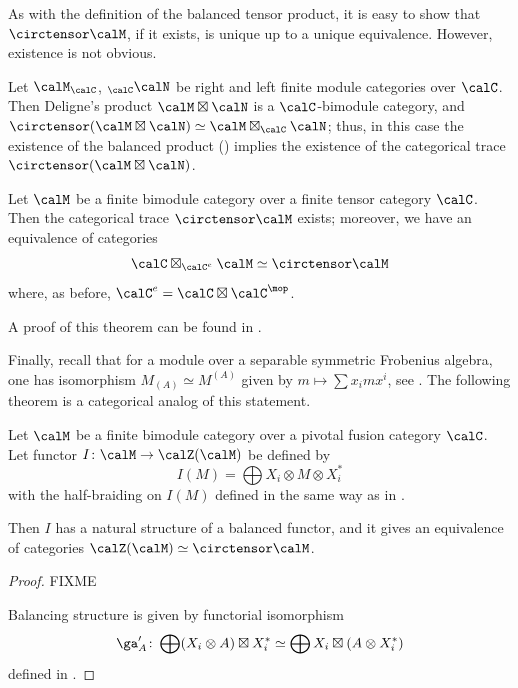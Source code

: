As with the definition of the balanced tensor product, it is easy to show that
$\circtensor \calM$, if it exists, is unique up to a unique equivalence. However,
existence is not obvious.

\begin{example}\label{x:trace-deligne-product}
  Let $\calM_\calC$, ${}_\calC \calN$ be right and left finite module
  categories over $\calC$. Then Deligne's product $\calM\boxtimes \calN$ is
  a $\calC$-bimodule category, and $\circtensor (\calM\boxtimes \calN)\simeq
  \calM\boxtimes_\calC\calN$; thus, in this case the existence of the balanced product
  () implies the existence of the categorical trace
  $\circtensor (\calM\boxtimes\calN)$.
\end{example}
\begin{theorem}\label{t:cat-trace}
  Let $\calM$ be a finite bimodule category over a finite tensor category
  $\calC$. Then the categorical trace $\circtensor \calM$ exists;
  moreover, we have an equivalence of categories
  $$
    \calC\boxtimes_{\calC^e} \calM \simeq \circtensor \calM
  $$
  where, as before, $\calC^e=\calC\boxtimes\calC^\mop$.
\end{theorem}
  A proof of this theorem can be found in
  \cite[Theorem 3.3]{fuchs-schaumann-schweigert-trace}.


Finally, recall that for a module over a separable symmetric Frobenius algebra,
one has isomorphism $M_{(A)}\simeq M^{(A)}$ given by $m\mapsto \sum x_imx^i$,
see . The following theorem is a categorical analog of
this statement.

\begin{theorem}\label{t:category-inv-coinv}
  Let $\calM$ be a finite bimodule category over a pivotal fusion
  category  $\calC$. Let functor $I\colon \calM\to \calZ(\calM)$ be defined by
  \begin{equation}
    I(M)= \bigoplus X_i\otimes M\otimes X_i^*
  \end{equation}
  with the half-braiding on $I(M)$ defined in the same way as in
  .

  Then $I$ has a natural structure of a balanced functor, and it
  gives an equivalence of categories $\calZ(\calM)\simeq \circtensor \calM$.
\end{theorem}
\begin{proof}
    FIXME

    Balancing structure is given by functorial isomorphism
    $$
    \ga'_A\colon \bigoplus (X_i\otimes A) \boxtimes X_i^* \simeq
              \bigoplus X_i \boxtimes (A\otimes X_i^*)
    $$
    defined in .
\end{proof}